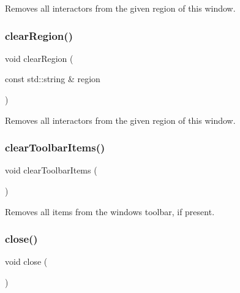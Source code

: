 Removes all interactors from the given region of this window. 

\mbox{\label{classGWindow_aeba526cb4d6d6f3d8d6f376656af8dc8}} 
\subsubsection{\texorpdfstring{clear\+Region()}{clearRegion()}\hspace{0.1cm}{\footnotesize\ttfamily [2/2]}}
{\footnotesize\ttfamily void clear\+Region (\begin{DoxyParamCaption}\item[{const std\+::string \&}]{region }\end{DoxyParamCaption})\hspace{0.3cm}{\ttfamily [virtual]}}



Removes all interactors from the given region of this window. 

\mbox{\label{classGWindow_a7f7fac3c967032599677ee0087af2220}} 
\subsubsection{\texorpdfstring{clear\+Toolbar\+Items()}{clearToolbarItems()}}
{\footnotesize\ttfamily void clear\+Toolbar\+Items (\begin{DoxyParamCaption}{ }\end{DoxyParamCaption})\hspace{0.3cm}{\ttfamily [virtual]}}



Removes all items from the window\textquotesingle{}s toolbar, if present. 

\mbox{\label{classGWindow_a5ae591df94fc66ccb85cbb6565368bca}} 
\subsubsection{\texorpdfstring{close()}{close()}}
{\footnotesize\ttfamily void close (\begin{DoxyParamCaption}{ }\end{DoxyParamCaption})\hspace{0.3cm}{\ttfamily [virtual]}}



